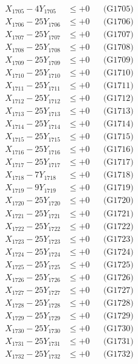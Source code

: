 \documentclass[a4paper,10pt]{article}
\begin{document}
{\begin{align}
X_{1705} - 4Y_{1705} &\leq +0 && \text{(G1705)} \\
X_{1706} - 25Y_{1706} &\leq +0 && \text{(G1706)} \\
X_{1707} - 25Y_{1707} &\leq +0 && \text{(G1707)} \\
X_{1708} - 25Y_{1708} &\leq +0 && \text{(G1708)} \\
X_{1709} - 25Y_{1709} &\leq +0 && \text{(G1709)} \\
X_{1710} - 25Y_{1710} &\leq +0 && \text{(G1710)} \\
\allowbreak
X_{1711} - 25Y_{1711} &\leq +0 && \text{(G1711)} \\
X_{1712} - 25Y_{1712} &\leq +0 && \text{(G1712)} \\
X_{1713} - 25Y_{1713} &\leq +0 && \text{(G1713)} \\
X_{1714} - 25Y_{1714} &\leq +0 && \text{(G1714)} \\
X_{1715} - 25Y_{1715} &\leq +0 && \text{(G1715)} \\
X_{1716} - 25Y_{1716} &\leq +0 && \text{(G1716)} \\
X_{1717} - 25Y_{1717} &\leq +0 && \text{(G1717)} \\
X_{1718} - 7Y_{1718} &\leq +0 && \text{(G1718)} \\
X_{1719} - 9Y_{1719} &\leq +0 && \text{(G1719)} \\
X_{1720} - 25Y_{1720} &\leq +0 && \text{(G1720)} \\
\allowbreak
X_{1721} - 25Y_{1721} &\leq +0 && \text{(G1721)} \\
X_{1722} - 25Y_{1722} &\leq +0 && \text{(G1722)} \\
X_{1723} - 25Y_{1723} &\leq +0 && \text{(G1723)} \\
X_{1724} - 25Y_{1724} &\leq +0 && \text{(G1724)} \\
X_{1725} - 25Y_{1725} &\leq +0 && \text{(G1725)} \\
X_{1726} - 25Y_{1726} &\leq +0 && \text{(G1726)} \\
X_{1727} - 25Y_{1727} &\leq +0 && \text{(G1727)} \\
X_{1728} - 25Y_{1728} &\leq +0 && \text{(G1728)} \\
X_{1729} - 25Y_{1729} &\leq +0 && \text{(G1729)} \\
X_{1730} - 25Y_{1730} &\leq +0 && \text{(G1730)} \\
\allowbreak
X_{1731} - 25Y_{1731} &\leq +0 && \text{(G1731)} \\
X_{1732} - 25Y_{1732} &\leq +0 && \text{(G1732)} \\

\end{align}}
\end{document}
